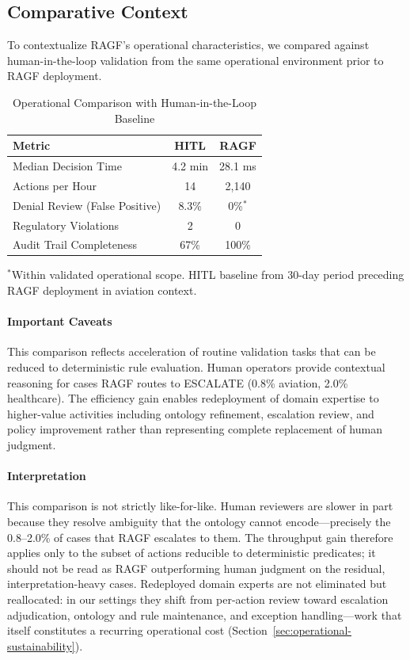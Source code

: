 \documentclass[sigconf,nonacm]{acmart}
\begin{document}
\subsection{Comparative Context}

To contextualize RAGF's operational characteristics, we compared against human-in-the-loop validation from the same operational environment prior to RAGF deployment.

\begin{table}[htbp]
\caption{Operational Comparison with Human-in-the-Loop Baseline}
\label{tab:comparison}
\begin{tabular}{@{}lcc@{}}
\toprule
\textbf{Metric} & \textbf{HITL} & \textbf{RAGF} \\
\midrule
Median Decision Time & 4.2 min & 28.1 ms \\
Actions per Hour & 14 & 2,140 \\
Denial Review (False Positive) & 8.3\% & 0\%$^*$ \\
Regulatory Violations & 2 & 0 \\
Audit Trail Completeness & 67\% & 100\% \\
\bottomrule
\end{tabular}
\medskip
\small
$^*$Within validated operational scope. HITL baseline from 30-day period preceding RAGF deployment in aviation context.
\end{table}

\paragraph{Important Caveats} This comparison reflects acceleration of routine validation tasks that can be reduced to deterministic rule evaluation. Human operators provide contextual reasoning for cases RAGF routes to ESCALATE (0.8\% aviation, 2.0\% healthcare). The efficiency gain enables redeployment of domain expertise to higher-value activities including ontology refinement, escalation review, and policy improvement rather than representing complete replacement of human judgment.

\paragraph{Interpretation} This comparison is not strictly like-for-like. Human reviewers are slower in part because they resolve ambiguity that the ontology cannot encode---precisely the 0.8--2.0\% of cases that RAGF escalates to them. The throughput gain therefore applies only to the subset of actions reducible to deterministic predicates; it should not be read as RAGF outperforming human judgment on the residual, interpretation-heavy cases. Redeployed domain experts are not eliminated but reallocated: in our settings they shift from per-action review toward escalation adjudication, ontology and rule maintenance, and exception handling---work that itself constitutes a recurring operational cost (Section~\ref{sec:operational-sustainability}).
\end{document}
